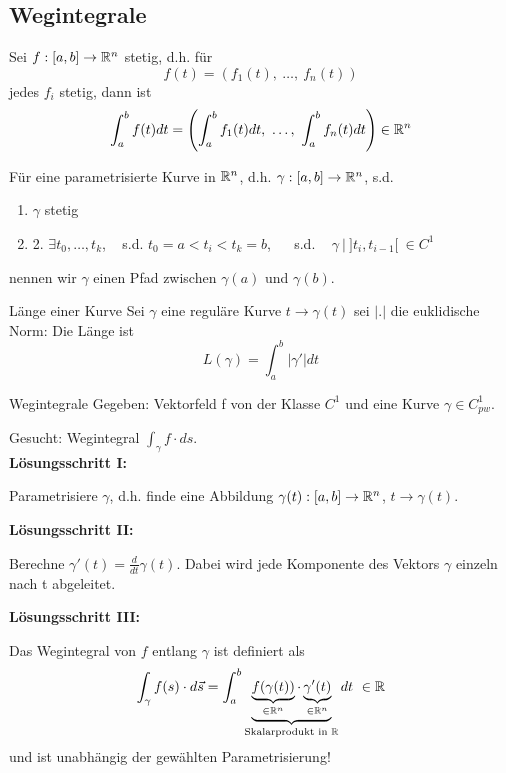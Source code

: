 \subsection{Wegintegrale}

Sei $f: [a, b] \rightarrow \mathbb{R}^{n}$ stetig, d.h. für
\[ f(t) = (f_1(t), ~ \ldots, ~ f_n(t)) \]
jedes $f_i$ stetig, dann ist
\[ \int_a^b f(t) dt = \left( \int_a^b f_1(t) dt, ~ \ldots , ~ \int_a^b f_n(t) dt\right) \in \mathbb{R}^n \]

Für eine parametrisierte Kurve in $\mathbb{R}^n$, d.h.
$\gamma : [a, b] \rightarrow \mathbb{R}^n$, s.d.
\begin{enumerate}
\item{ $\gamma$ stetig}
\item{2. $\exists t_0, \ldots, t_k$, ~ s.d. $t_0 = a < t_i < t_k = b$, ~~ s.d. ~
$\gamma ~ | ~ ]t_i, t_{i-1}[ ~ \in C^1$}
\end{enumerate}
nennen wir $\gamma$ einen Pfad zwischen
$\gamma(a)$ und $\gamma(b)$. 

\begin{Satz}{Länge einer Kurve}{}
	Sei $\gamma$ eine reguläre Kurve $t \to \gamma(t)$ sei $|.|$ die euklidische Norm: Die Länge ist
	\[
  		L(\gamma) = \int_a^b |\gamma'| dt
  	\]
\end{Satz}

\begin{Rezept}{Wegintegrale}{}
	Gegeben: Vektorfeld f von der Klasse $C^1$ und eine Kurve $\gamma \in C^1_{pw}$.
	
	Gesucht: Wegintegral $\int_\gamma f \cdot ds$.\\
	
	\textbf{Lösungsschritt I:}
	
	Parametrisiere $\gamma$, d.h. finde eine Abbildung $\gamma(t) : [a, b] \to \mathbb{R}^n$, $t \to \gamma(t)$.
	
	\textbf{Lösungsschritt II:}
	
	Berechne $\gamma'(t) = \frac{d}{dt} \gamma(t)$. Dabei wird jede Komponente des Vektors $\gamma$ einzeln nach t abgeleitet.
	
	\textbf{Lösungsschritt III:}
	
	Das Wegintegral von $f$ entlang $\gamma$ ist definiert als
	\[
		\int_{\gamma} f(s)\cdot d\vec{s} = 
		\int_a^b \underbrace{\underbrace{f(\gamma(t))}_{\in\mathbb{R}^n}  \cdot 
		\underbrace{\gamma'(t)}_{\in\mathbb{R}^n}}_{\text{Skalarprodukt in } \mathbb{R}} dt  ~
		\in \mathbb{R}
	\]
	und ist unabhängig der gewählten Parametrisierung!
\end{Rezept}